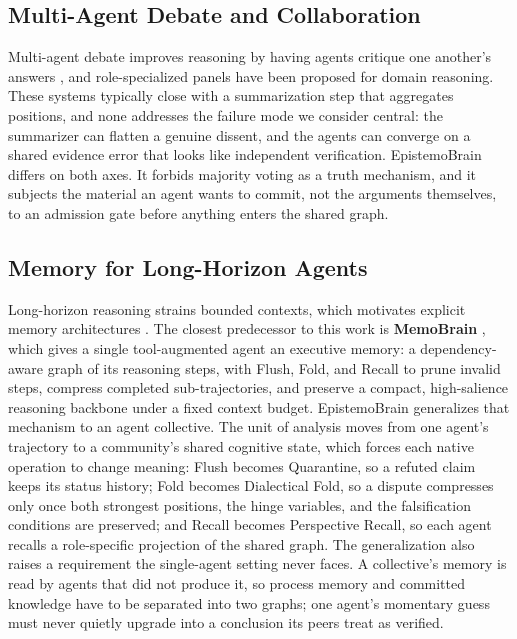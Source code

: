 \subsection{Multi-Agent Debate and Collaboration}

Multi-agent debate improves reasoning by having agents critique one
another's answers \citep{du2023improving,liang2023encouraging,chen2023agentverse,
qian2024chatdev}, and role-specialized panels have been proposed for domain
reasoning. These systems typically close with a summarization step that
aggregates positions, and none addresses the failure mode we consider
central: the summarizer can flatten a genuine dissent, and the agents can
converge on a shared evidence error that looks like independent verification.
EpistemoBrain differs on both axes. It forbids majority voting as a truth
mechanism, and it subjects the material an agent wants to commit, not the
arguments themselves, to an admission gate before anything enters the shared
graph.

\subsection{Memory for Long-Horizon Agents}

Long-horizon reasoning strains bounded contexts, which motivates explicit
memory architectures \citep{packer2023memgpt,sumers2023coala}. The closest
predecessor to this work is \textbf{MemoBrain} \citep{qian2026memobrain},
which gives a single tool-augmented agent an executive memory: a
dependency-aware graph of its reasoning steps, with Flush, Fold, and Recall
to prune invalid steps, compress completed sub-trajectories, and preserve a
compact, high-salience reasoning backbone under a fixed context budget.
EpistemoBrain generalizes that mechanism to an agent collective. The unit of
analysis moves from one agent's trajectory to a community's shared cognitive
state, which forces each native operation to change meaning: Flush becomes
Quarantine, so a refuted claim keeps its status history; Fold becomes
Dialectical Fold, so a dispute compresses only once both strongest positions,
the hinge variables, and the falsification conditions are preserved; and
Recall becomes Perspective Recall, so each agent recalls a role-specific
projection of the shared graph. The generalization also raises a requirement
the single-agent setting never faces. A collective's memory is read by agents
that did not produce it, so process memory and committed knowledge have to be
separated into two graphs; one agent's momentary guess must never quietly
upgrade into a conclusion its peers treat as verified.

